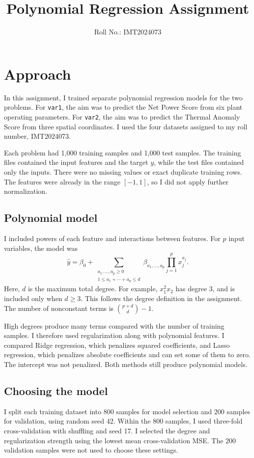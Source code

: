 \documentclass[11pt,a4paper]{article}
\title{Polynomial Regression Assignment}
\author{Roll No.: IMT2024073}
\date{}
\begin{document}
\maketitle
\vspace{-1.5em}

\section{Approach}
In this assignment, I trained separate polynomial regression models for the two
problems. For \texttt{var1}, the aim was to predict the Net Power Score from six
plant operating parameters. For \texttt{var2}, the aim was to predict the Thermal
Anomaly Score from three spatial coordinates. I used the four datasets assigned
to my roll number, IMT2024073.

Each problem had 1,000 training samples and 1,000 test samples. The training
files contained the input features and the target $y$, while the test files
contained only the inputs. There were no missing values or exact duplicate
training rows. The features were already in the range $[-1,1]$, so I did not
apply further normalization.

\subsection{Polynomial model}
I included powers of each feature and interactions between features. For $p$
input variables, the model was
\[
  \hat y=\beta_0+
  \sum_{\substack{a_1,\ldots,a_p\geq 0\\1\leq a_1+\cdots+a_p\leq d}}
  \beta_{a_1,\ldots,a_p}\prod_{j=1}^{p}x_j^{a_j}.
\]
Here, $d$ is the maximum total degree. For example, $x_1^2x_2$ has degree 3,
and is included only when $d\geq 3$. This follows the degree definition in the
assignment. The number of nonconstant terms is $\binom{p+d}{d}-1$.

High degrees produce many terms compared with the number of training samples.
I therefore used regularization along with polynomial features. I compared
Ridge regression, which penalizes squared coefficients, and Lasso regression,
which penalizes absolute coefficients and can set some of them to zero. The
intercept was not penalized. Both methods still produce polynomial models.

\subsection{Choosing the model}
I split each training dataset into 800 samples for model selection and 200
samples for validation, using random seed 42. Within the 800 samples, I used
three-fold cross-validation with shuffling and seed 17. I selected the degree
and regularization strength using the lowest mean cross-validation MSE.
The 200 validation samples were not used to choose these settings.
\end{document}
